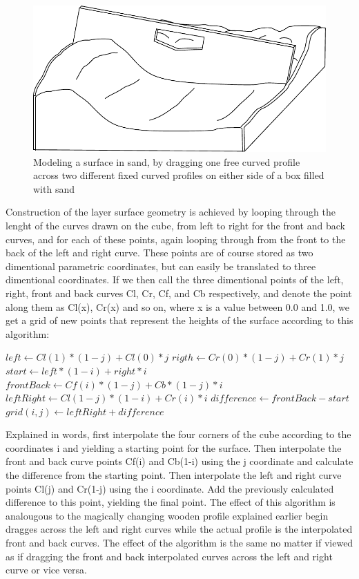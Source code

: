 \documentclass[a4paper,12pt]{report}
\begin{document}
\begin{figure}
 \includegraphics[width=\linewidth]{thesis/sandbox.pdf}
 \caption{Modeling a surface in sand, by dragging one free curved profile across two different fixed curved profiles on either side of a box filled with sand}
 \label{fig:wooden}
\end{figure}


Construction of the layer surface geometry is achieved by looping through the lenght of the curves drawn on the cube, from left to right for the front and back curves, and for each of these points, again looping through from the front to the back of the left and right curve. These points are of course stored as two dimentional parametric coordinates, but can easily be translated to three dimentional coordinates. If we then call the three dimentional points of the left, right, front and back curves Cl, Cr, Cf, and Cb respectively, and denote the point along them as Cl(x), Cr(x) and so on, where x is a value between 0.0 and 1.0, we get a grid of new points that represent the heights of the surface according to this algorithm:

\begin{algorithm}
\begin{algorithmic}
  \State $left \gets Cl(1)*(1-j) + Cl(0)*j$
  \State $rigth \gets Cr(0)*(1-j) + Cr(1)*j$
  \State $start \gets left*(1-i) + right*i$
  \State $frontBack \gets Cf(i)*(1-j) + Cb*(1-j)*i$
  \State $leftRight \gets Cl(1-j)*(1-i) + Cr(i)*i$
  \State $difference \gets frontBack - start$
  \State $grid(i,j) \gets leftRight + difference$
\EndFor
\end{algorithmic}
\end{algorithm}

Explained in words, first interpolate the four corners of the cube according to the coordinates i and yielding a starting point for the surface. Then interpolate the front and back curve points Cf(i) and Cb(1-i) using the j coordinate and calculate the difference from the starting point. Then interpolate the left and right curve points Cl(j) and Cr(1-j) using the i coordinate. Add the previously calculated difference to this point, yielding the final point. The effect of this algorithm is analougous to the magically changing wooden profile explained earlier begin dragges across the left and right curves while the actual profile is the interpolated front and back curves. The effect of the algorithm is the same no matter if viewed as if dragging the front and back interpolated curves across the left and right curve or vice versa.
\end{document}
